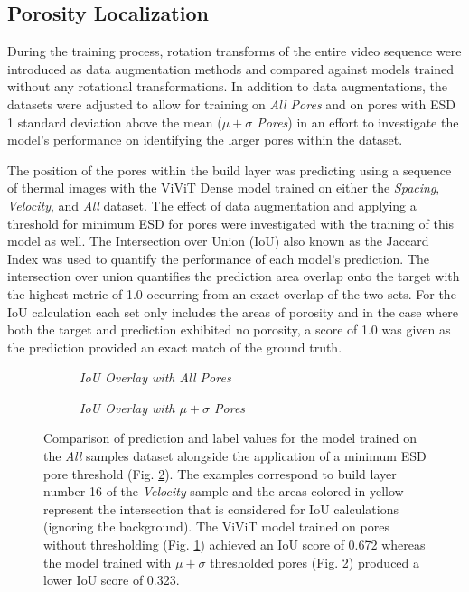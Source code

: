 \subsection{Porosity Localization}

During the training process, rotation transforms of the entire video sequence
were introduced as data augmentation methods and compared against models trained
without any rotational transformations. In addition to data augmentations, the
datasets were adjusted to allow for training on \textit{All Pores} and on pores
with ESD 1 standard deviation above the mean (\textit{$\mu + \sigma$ Pores}) in
an effort to investigate the model's performance on identifying the larger pores
within the dataset.

The position of the pores within the build layer was predicting using a sequence
of thermal images with the ViViT Dense model trained on either the
\textit{Spacing}, \textit{Velocity}, and \textit{All} dataset. The effect of
data augmentation and applying a threshold for minimum ESD for
pores were investigated with the training of this model as well. The
Intersection over Union (IoU) also known as the Jaccard Index was used to
quantify the performance of each model's prediction. The intersection over union
quantifies the prediction area overlap onto the target with the highest metric
of 1.0 occurring from an exact overlap of the two sets. For the IoU calculation
each set only includes the areas of porosity and in the case where both the
target and prediction exhibited no porosity, a score of 1.0 was given as the
prediction provided an exact match of the ground truth. 

\begin{figure}[bt]
  \centering
  \begin{subfigure}[b]{0.45\textwidth}
    \centering
    
    \caption{\textit{IoU Overlay with \textit{All Pores}}}
    \label{fig:iou}
  \end{subfigure}
  \begin{subfigure}[b]{0.45\textwidth}
    \centering
    
    \caption{\textit{IoU Overlay with \textit{$\mu + \sigma$ Pores}}}
    \label{fig:iou_threshold}
  \end{subfigure}
  \caption{
    Comparison of prediction and label values for the model trained on the
    \textit{All} samples dataset alongside the application of a minimum ESD pore
    threshold (Fig. \ref{fig:iou_threshold}). The examples correspond to build
    layer number 16 of the \textit{Velocity} sample and the areas colored in
    yellow represent the intersection that is considered for IoU calculations
    (ignoring the background). The ViViT model trained on pores without
    thresholding (Fig. \ref{fig:iou}) achieved an IoU score of 0.672 whereas the
    model trained with \textit{$\mu + \sigma$} thresholded pores (Fig.
    \ref{fig:iou_threshold}) produced a lower IoU score of 0.323.
  }
  \label{fig:ious}
\end{figure}

